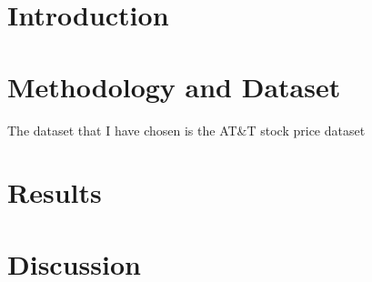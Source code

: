 \documentclass{report}
\begin{document}
\section{Introduction}

\section{Methodology and Dataset}
The dataset that I have chosen is the AT&T stock price dataset

\section{Results}

\section{Discussion}
\end{document}
